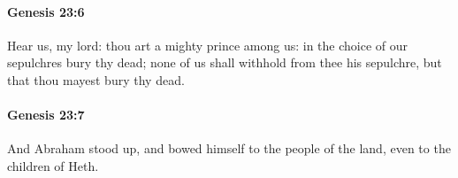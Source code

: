 		\paragraph{Genesis 23:6} %
			\label{GENESIS-23-6}

			Hear us, my lord: thou art a mighty prince among us: in the choice of our sepulchres bury thy dead; none of us shall withhold from thee his sepulchre, but that thou mayest bury thy dead.


		\paragraph{Genesis 23:7} %
			\label{GENESIS-23-7}

			And Abraham stood up, and bowed himself to the people of the land, even to the children of Heth.


